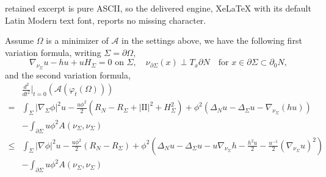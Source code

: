 \documentclass[10pt,a4paper]{amsart}
\newcommand{\p}{\partial}
\newcommand{\sff}{\mathrm{I\!I}}
\begin{document}
retained excerpt is pure ASCII, so the delivered engine, XeLaTeX with its default Latin Modern text font, reports no missing character.
	\begin{theorem} \label{VarForm}
		Assume $\Omega$ is a minimizer of $\mathcal{A}$ in the settings above, we have the following first  variation formula, writing $\Sigma =\p \Omega$,
		\begin{equation*}
			\nabla_{\nu_{\Sigma}} u-hu+uH_{\Sigma} =0 \text{ on } \Sigma, \quad \nu_{\partial \Sigma} (x) \perp T_x\partial N \quad \text{for }x \in \partial \Sigma \subset \partial_0 N ,
		\end{equation*}
		and the second variation formula,
		\begin{align*}
			&\frac{d^2}{dt^2}\Big\vert_{t=0}(\mathcal{A}(\varphi_t(\Omega)))\\
			=&\int_{\Sigma} |\nabla_{\Sigma} \phi|^2u  -\frac{u\phi^2}{2}(R_{N}-R_{\Sigma}+|\sff|^2+H^2_{\Sigma})+ \phi^2 (\Delta_N u-\Delta_{\Sigma}u-\nabla_{\nu_{\Sigma}} (hu))\\
			& -\int_{\partial \Sigma} u  \phi^2 A(\nu_{\Sigma},\nu_{\Sigma})\\
			\leq & \int_{\Sigma} |\nabla \phi|^2u  -\frac{u\phi^2}{2}(R_{N}-R_{\Sigma})+\phi^2(\Delta_N u-\Delta_{\Sigma}u-u\nabla_{\nu_{\Sigma}} h-\frac{h^2u}{2}-\frac{u^{-1}}{2}(\nabla_{\nu_{\Sigma}}u)^2)\\
			& -\int_{\partial \Sigma} u  \phi^2 A(\nu_{\Sigma},\nu_{\Sigma})
		\end{align*}
	\end{theorem}
\end{document}
